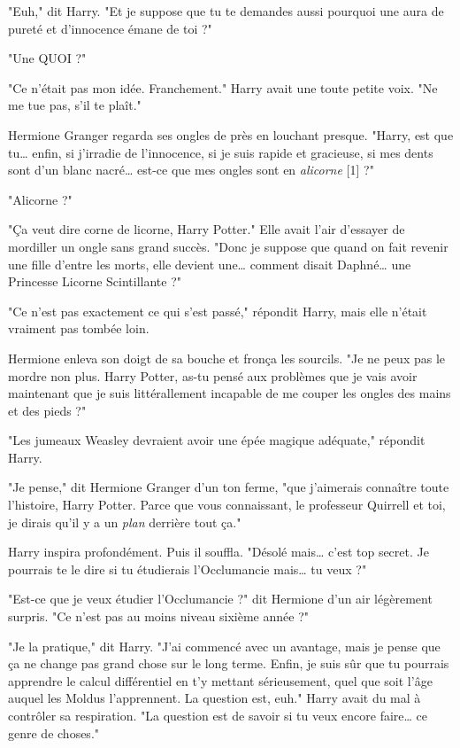 "Euh," dit Harry. "Et je suppose que tu te demandes aussi pourquoi une aura de pureté et d'innocence émane de toi ?"

"Une QUOI ?"

"Ce n'était pas mon idée. Franchement." Harry avait une toute petite voix. "Ne me tue pas, s'il te plaît."

Hermione Granger regarda ses ongles de près en louchant presque. "Harry, est que tu… enfin, si j'irradie de l'innocence, si je suis rapide et gracieuse, si mes dents sont d'un blanc nacré… est-ce que mes ongles sont en \emph{alicorne}  [1] ?"

"Alicorne ?"

"Ça veut dire corne de licorne, Harry Potter." Elle avait l'air d'essayer de mordiller un ongle sans grand succès. "Donc je suppose que quand on fait revenir une fille d'entre les morts, elle devient une… comment disait Daphné… une Princesse Licorne Scintillante ?"

"Ce n'est pas exactement ce qui s'est passé," répondit Harry, mais elle n'était vraiment pas tombée loin.

Hermione enleva son doigt de sa bouche et fronça les sourcils. "Je ne peux pas le mordre non plus. Harry Potter, as-tu pensé aux problèmes que je vais avoir maintenant que je suis littérallement incapable de me couper les ongles des mains et des pieds ?"

"Les jumeaux Weasley devraient avoir une épée magique adéquate," répondit Harry.

"Je pense," dit Hermione Granger d'un ton ferme, "que j'aimerais connaître toute l'histoire, Harry Potter. Parce que vous connaissant, le professeur Quirrell et toi, je dirais qu'il y a un \emph{plan}  derrière tout ça."

Harry inspira profondément. Puis il souffla. "Désolé mais… c'est top secret. Je pourrais te le dire si tu étudierais l'Occlumancie mais… tu veux ?"

"Est-ce que je veux étudier l'Occlumancie ?" dit Hermione d'un air légèrement surpris. "Ce n'est pas au moins niveau sixième année ?"

"Je la pratique," dit Harry. "J'ai commencé avec un avantage, mais je pense que ça ne change pas grand chose sur le long terme. Enfin, je suis sûr que tu pourrais apprendre le calcul différentiel en t'y mettant sérieusement, quel que soit l'âge auquel les Moldus l'apprennent. La question est, euh." Harry avait du mal à contrôler sa respiration. "La question est de savoir si tu veux encore faire… ce genre de choses."

